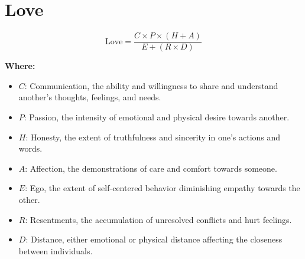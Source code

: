 \chapter{Love}

\begin{equation}
\text{Love} = \frac{C \times P \times (H + A)}{E + (R \times D)}
\end{equation}

\textbf{Where:}

\begin{itemize}
    \item $C$: Communication, the ability and willingness to share and understand another's thoughts, feelings, and needs.
    \item $P$: Passion, the intensity of emotional and physical desire towards another.
    \item $H$: Honesty, the extent of truthfulness and sincerity in one’s actions and words.
    \item $A$: Affection, the demonstrations of care and comfort towards someone.
    \item $E$: Ego, the extent of self-centered behavior diminishing empathy towards the other.
    \item $R$: Resentments, the accumulation of unresolved conflicts and hurt feelings.
    \item $D$: Distance, either emotional or physical distance affecting the closeness between individuals.
\end{itemize}